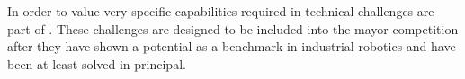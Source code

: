 
In order to value very specific capabilities required in \RCAW technical challenges are part of \RCAW.
These challenges are designed to be included into the mayor competition after they have shown a potential as a benchmark in industrial robotics and have been at least solved in principal.




